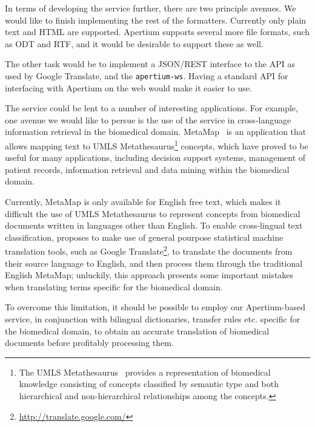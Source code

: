\documentclass[11pt]{article}
\begin{document}
In terms of developing the service further, there are two principle avenues. We would
like to finish implementing the rest of the formatters. Currently only plain text 
and HTML are supported. Apertium supports several more file formats, such as ODT 
and RTF, and it would be desirable to support these as well. 

The other task would be to implement a JSON/REST interface to the API as used by
Google Translate, and the {\tt\small apertium-ws}. Having a standard API for 
interfacing with Apertium on the web would make it easier to use.

The service could be lent to a number of interesting applications. For example, one 
avenue we would like to persue is the use of the service in cross-language
information retrieval in the biomedical domain. MetaMap~\citep{metamap} is an application 
that allows mapping text to UMLS Metathesaurus\footnote{The UMLS Metathesaurus~\citep{umls} 
provides a representation of biomedical knowledge consisting of concepts classified by 
semantic type and both hierarchical and non-hierarchical relationships among the concepts.} 
concepts, which have proved to be useful for many applications, including decision 
support systems, management of patient records, information retrieval and data mining 
within the biomedical domain.

Currently, MetaMap is only available for English free text, which makes it difficult the use of UMLS Metathesaurus to represent concepts from biomedical documents written in languages other than English. To enable cross-lingual text classification, \cite{metamapes} proposes to make use of general pourpose statistical machine translation tools, such as Google Translate\footnote{\small\url{http://translate.google.com/}}, to translate the documents from their source language to English, and then process them through the traditional English MetaMap; unluckily, this approach presents some important mistakes when translating terms specific for the biomedical domain.

To overcome this limitation, it should be possible to employ our Apertium-based service, in conjunction with bilingual dictionaries, transfer rules etc. specific for the biomedical domain, to obtain an accurate translation of biomedical documents before profitably processing them.
\end{document}
